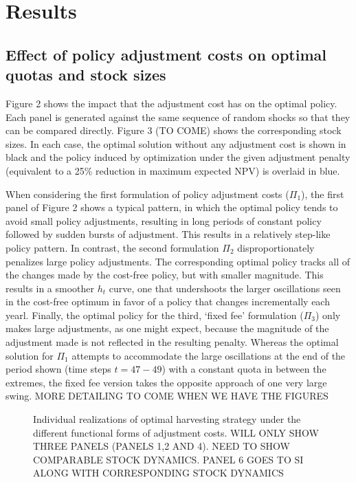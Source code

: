\documentclass[12pt]{article}
\begin{document}
\section{Results}
\subsection*{Effect of policy adjustment costs on optimal quotas and stock sizes}
Figure 2 shows the impact that the adjustment cost has on the optimal policy.   Each panel is generated against the same sequence of random shocks so that they can be compared directly. Figure 3 (TO COME) shows the corresponding stock sizes.  In each case, the optimal solution without any adjustment cost is shown in black and the policy induced by optimization under the given adjustment penalty (equivalent to a 25\% reduction in maximum expected NPV) is overlaid in blue.  

When considering the first formulation of policy adjustment costs ($\Pi_1$), the first  panel of Figure 2 shows a typical pattern, in which the optimal policy tends to avoid small policy adjustments, resulting in long periods of constant policy followed by sudden bursts of adjustment. This results in a relatively step-like policy pattern.  In contrast, the second formulation $\Pi_2$ disproportionately penalizes large policy adjustments. The corresponding optimal policy tracks all of the changes made by the cost-free policy, but with smaller magnitude.  This results in a smoother $h_t$ curve, one that undershoots the larger oscillations seen in the cost-free optimum in favor of a policy that changes incrementally each yearl.  Finally, the optimal policy for the third, `fixed fee' formulation ($\Pi_3$) only makes large adjustments, as one might expect, because the magnitude of the adjustment made is not reflected in the resulting penalty.  Whereas the optimal solution for $\Pi_1$ attempts to accommodate the large oscillations at the end of the period shown (time steps $t=47-49$) with a constant quota in between the extremes, the fixed fee version takes the opposite approach of one very large swing. MORE DETAILING TO COME WHEN WE HAVE THE FIGURES

\begin{figure}
  \caption{Individual realizations of optimal harvesting strategy under the different functional forms of adjustment costs. WILL ONLY SHOW THREE PANELS (PANELS 1,2 AND 4). NEED TO SHOW COMPARABLE STOCK DYNAMICS. PANEL 6 GOES TO SI ALONG WITH CORRESPONDING STOCK DYNAMICS}
\end{figure}
\end{document}
